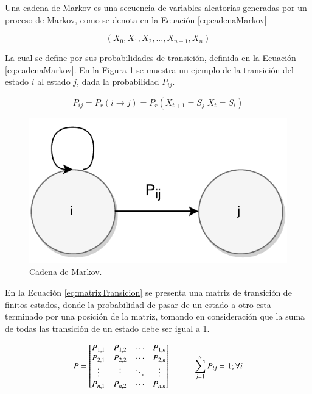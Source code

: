 Una cadena de Markov es una secuencia de variables aleatorias generadas por un proceso de Markov, como se denota en la Ecuación \ref{eq:cadenaMarkov}

\begin{equation} \label{eq:cadenaMarkov}
	(X_0, X_1, X_2, ..., X_{n-1}, X_{n})
\end{equation}

La cual se define por sus probabilidades de transición, definida en la Ecuación \ref{eq:cadenaMarkov}. En la Figura \ref{fig:cadenaMarkov} se muestra un ejemplo de la transición del estado $i$ al estado $j$, dada la probabilidad $P_{ij}$.

\begin{equation} \label{eq:transicionMarkov}
	P_{ij} = P_r(i \rightarrow j) = P_r(X_{t+1} = S_j | X_t = S_i)
\end{equation}

\begin{figure}[ht!]
  \centering
    \includegraphics[scale=0.6]{images/CadenaMarkov.pdf}
  \caption{Cadena de Markov.}
  \label{fig:cadenaMarkov}
\end{figure}

En la Ecuación \ref{eq:matrizTransicion} se presenta una matriz de transición de finitos estados, donde la probabilidad de pasar de un estado a otro esta terminado por una posición de la matriz, tomando en consideración que la suma de todas las transición de un estado debe ser igual a 1.

\begin{equation} \label{eq:matrizTransicion}
	P =
	\begin{bmatrix}
		P_{1,1} & P_{1,2} & \cdots & P_{1,n} \\
		P_{2,1} & P_{2,2} & \cdots & P_{2,n} \\
		\vdots  & \vdots  & \ddots & \vdots  \\
		P_{n,1} & P_{n,2} & \cdots & P_{n,n} \\
	\end{bmatrix}
	\hspace*{1cm} \sum_{j=1}^{n} P_{ij} = 1 ; \forall i
\end{equation}

